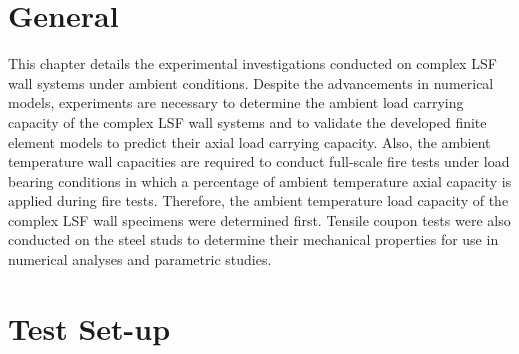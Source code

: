 \section{General}

This chapter details the experimental investigations conducted on complex LSF wall systems under ambient conditions. Despite the advancements in numerical models, experiments are necessary to determine the ambient load carrying capacity of the complex LSF wall systems and to validate the developed finite element models to predict their axial load carrying capacity. Also, the ambient temperature wall capacities are required to conduct full-scale fire tests under load bearing conditions in which a percentage of ambient temperature axial capacity is applied during fire tests. Therefore, the ambient temperature load capacity of the complex LSF wall specimens were determined first. Tensile coupon tests were also conducted on the steel studs to determine their mechanical properties for use in numerical analyses and parametric studies.  

\section{Test Set-up}

